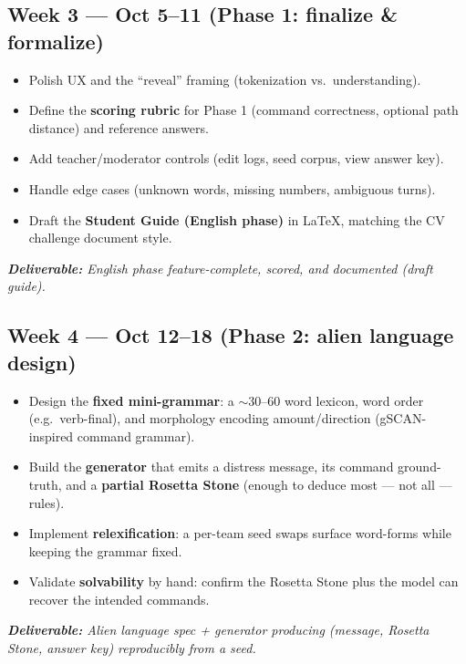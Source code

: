 \documentclass[a4]{article}
\newcommand{\deliv}[1]{\textit{\textbf{Deliverable:} #1}}
\begin{document}
\subsection*{Week 3 --- Oct 5--11 \quad (Phase 1: finalize \& formalize)}
\begin{itemize}[leftmargin=*, itemsep=1pt]
    \item Polish UX and the ``reveal'' framing (tokenization vs.\ understanding).
    \item Define the \textbf{scoring rubric} for Phase 1 (command correctness,
    optional path distance) and reference answers.
    \item Add teacher/moderator controls (edit logs, seed corpus, view answer key).
    \item Handle edge cases (unknown words, missing numbers, ambiguous turns).
    \item Draft the \textbf{Student Guide (English phase)} in LaTeX, matching the CV
    challenge document style.
\end{itemize}
\deliv{English phase feature-complete, scored, and documented (draft guide).}

\subsection*{Week 4 --- Oct 12--18 \quad (Phase 2: alien language design)}
\begin{itemize}[leftmargin=*, itemsep=1pt]
    \item Design the \textbf{fixed mini-grammar}: a $\sim$30--60 word lexicon,
    word order (e.g.\ verb-final), and morphology encoding amount/direction
    (gSCAN-inspired command grammar).
    \item Build the \textbf{generator} that emits a distress message, its command
    ground-truth, and a \textbf{partial Rosetta Stone} (enough to deduce most --- not
    all --- rules).
    \item Implement \textbf{relexification}: a per-team seed swaps surface
    word-forms while keeping the grammar fixed.
    \item Validate \textbf{solvability} by hand: confirm the Rosetta Stone plus the
    model can recover the intended commands.
\end{itemize}
\deliv{Alien language spec + generator producing (message, Rosetta Stone, answer key) reproducibly from a seed.}
\end{document}
